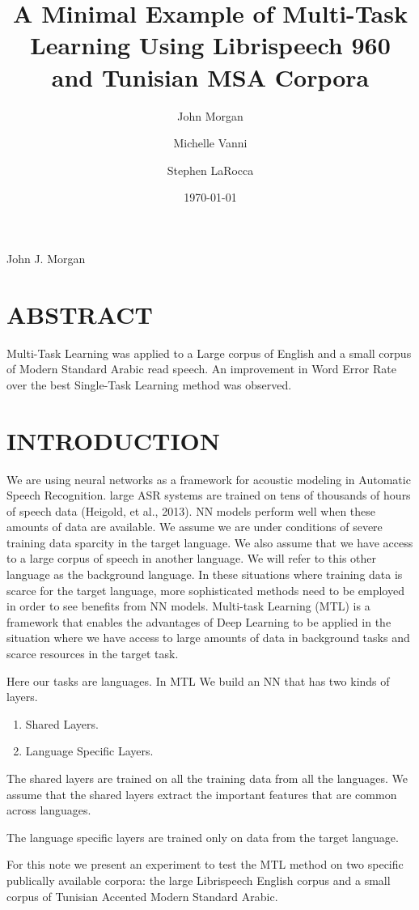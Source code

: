 \documentclass[11pt]{article}
\author{John Morgan \and Michelle Vanni \and Stephen LaRocca }
\date{\today}
\title{A Minimal Example of Multi-Task Learning Using Librispeech 960 and Tunisian MSA Corpora}
\begin{document}
\maketitle
\tableofcontents

John J. Morgan

\section{ABSTRACT}
\label{sec-1}
Multi-Task Learning was applied to a Large corpus of English and a small corpus of Modern Standard Arabic  read speech. 
An improvement in Word Error Rate over the best Single-Task Learning method was observed. 
\section{INTRODUCTION}
\label{sec-2}
We are using neural networks as a framework for acoustic modeling in Automatic Speech Recognition. 
large ASR systems are trained on tens of thousands of hours of speech data (Heigold, et al., 2013). 
NN models perform well when these amounts of data are available. 
We assume we are under conditions of severe training data sparcity in the target language.
We also assume that we have access to a large corpus of speech in another language. 
We will refer to this other language as the background language.
In these situations where training data is scarce for the target language, more sophisticated methods need to be employed in order to see benefits from NN models. 
Multi-task Learning (MTL) is a framework that enables the advantages of Deep Learning to be applied in the situation where we have access to large amounts of data in background tasks and scarce   resources in the target task.  

Here our tasks are languages.
In MTL We build an NN that has two kinds of layers.
\begin{enumerate}
\item Shared Layers.
\item Language Specific Layers.
\end{enumerate}

The shared layers are trained on all the training data from all the languages.
We assume that the shared layers extract the important features that are common across languages. 

The language specific layers are trained only on data from the target language.

For this note we present an experiment to test the MTL method on two specific publically available corpora: the large Librispeech English corpus and a small corpus of Tunisian Accented Modern Standard Arabic. 
\end{document}
